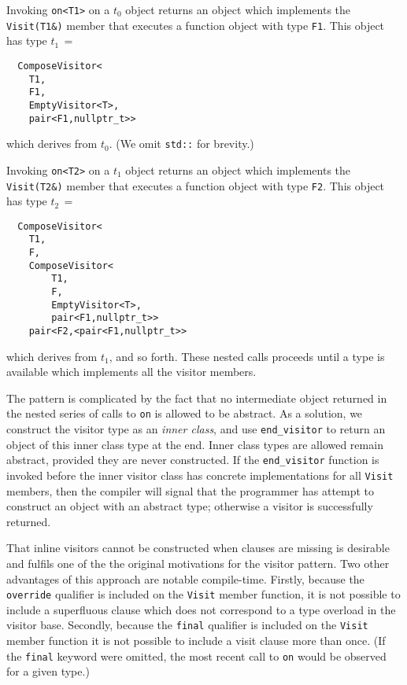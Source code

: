 \documentclass[10pt,a4paper,twocolumn]{article}
\newcommand\mycode[1]{{\small\texttt{#1}}}
\begin{document}
Invoking \mycode{on<T1>} on a $t_0$ object returns an object which implements the \mycode{Visit(T1\&)} member that executes a function object with type \mycode{F1}. This object has type $t_1\, =$
{\small\begin{verbatim}
  ComposeVisitor<
    T1,
    F1,
    EmptyVisitor<T>,
    pair<F1,nullptr_t>>
\end{verbatim}}
which derives from $t_0$. (We omit \mycode{std::} for brevity.)

Invoking \mycode{on<T2>} on a $t_1$ object returns an object which implements the \mycode{Visit(T2\&)} member that executes a function object with type \mycode{F2}. This object has type $t_2\, =$
{\small\begin{verbatim}
  ComposeVisitor<
    T1,
    F,
    ComposeVisitor<
        T1,
        F,
        EmptyVisitor<T>,
        pair<F1,nullptr_t>>
    pair<F2,<pair<F1,nullptr_t>>
\end{verbatim}}
which derives from $t_1$, and so forth. These nested calls proceeds until a type is available which implements all the visitor members.

The pattern is complicated by the fact that no intermediate object returned in the nested series of calls to \mycode{on} is allowed to be abstract. As a solution, we construct the visitor type as an \emph{inner class}, and use \mycode{end\_visitor} to return an object of this inner class type at the end. Inner class types are allowed remain abstract, provided they are never constructed. If the \mycode{end\_visitor} function is invoked before the inner visitor class has concrete implementations for all \mycode{Visit} members, then the compiler will signal that the programmer has attempt to construct an object with an abstract type; otherwise a visitor is successfully returned.

That inline visitors cannot be constructed when clauses are missing is desirable and fulfils one of the the original motivations for the visitor pattern. Two other advantages of this approach are notable compile-time. Firstly, because the \mycode{override} qualifier is included on the \mycode{Visit} member function, it is not possible to include a superfluous clause which does not correspond to a type overload in the visitor base. Secondly, because the \mycode{final} qualifier is included on the \mycode{Visit} member function it is not possible to include a visit clause more than once. (If the \mycode{final} keyword were omitted, the most recent call to \mycode{on} would be observed for a given type.)
\end{document}
